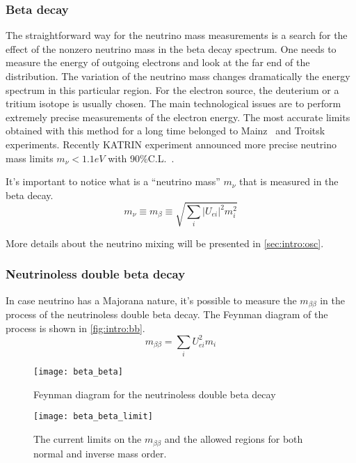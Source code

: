 \documentclass[../main.tex]{subfiles}
\begin{document}
\subsubsection{Beta decay}
The straightforward way for the neutrino mass measurements is a search for the effect of the nonzero neutrino mass in the beta decay spectrum. One needs to measure the energy of outgoing electrons and look at the far end of the distribution. The variation of the neutrino mass changes dramatically the energy spectrum in this particular region. For the electron source, the deuterium or a tritium isotope is usually chosen. The main technological issues are to perform extremely precise measurements of the electron energy. The most accurate limits obtained with this method for a long time belonged to Mainz~\cite{Kraus2005} and Troitsk~\cite{Aseev2011} experiments. Recently KATRIN experiment announced more precise neutrino mass limits $m_\nu < 1.1 eV$ with 90\%C.L.~\cite{Aker2019}.

It's important to notice what is a ``neutrino mass'' $m_\nu$ that is measured in the beta decay.
\begin{equation}
m_\nu\equiv m_\beta\equiv\sqrt{\sum_i\left|U_{ei}\right|^2m_i^2}
\end{equation}

More details about the neutrino mixing will be presented in \autoref{sec:intro:osc}.

\subsubsection{Neutrinoless double beta decay}
In case neutrino has a Majorana nature, it's possible to measure the $m_{\beta\beta}$ in the process of the neutrinoless double beta decay. The Feynman diagram of the process is shown in \autoref{fig:intro:bb}.
\begin{equation}
m_{\beta\beta}=\sum_i U^2_{ei}m_i
\end{equation}

\begin{figure}
  \centering
  \begin{minipage}{0.49\linewidth}
    \texttt{[image: beta\_beta]}
    \caption{Feynman diagram for the neutrinoless double beta decay}
    \label{fig:intro:bb}
  \end{minipage}
  \begin{minipage}{0.49\linewidth}
    \texttt{[image: beta\_beta\_limit]}
    \caption{The current limits on the $m_{\beta\beta}$ and the allowed regions for both normal and inverse mass order.}
    \label{fig:intro:bb_lim}
  \end{minipage}
\end{figure}
\end{document}
